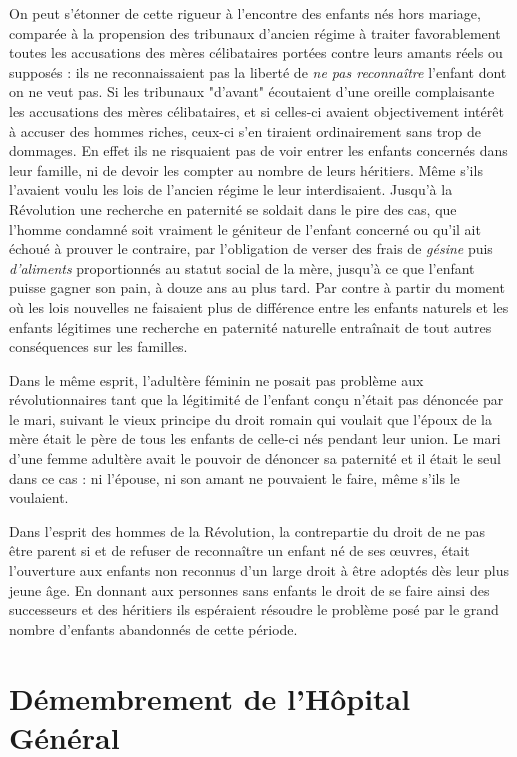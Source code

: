  On peut s'étonner de cette rigueur à l'encontre des enfants nés hors mariage, comparée à la propension des tribunaux d'ancien régime à traiter favorablement toutes les accusations des mères célibataires portées contre leurs amants réels ou supposés : ils ne reconnaissaient pas la liberté de \emph{ne pas reconnaître} l'enfant dont on ne veut pas. Si les tribunaux "d'avant" écoutaient d'une oreille complaisante les accusations des mères célibataires, et si celles-ci avaient objectivement intérêt à accuser des hommes riches, ceux-ci s'en tiraient ordinairement sans trop de dommages. En effet ils ne risquaient pas de voir entrer les enfants concernés dans leur famille, ni de devoir les compter au nombre de leurs héritiers. Même s'ils l'avaient voulu les lois de l'ancien régime le leur interdisaient. Jusqu'à la Révolution une recherche en paternité se soldait dans le pire des cas, que l’homme condamné soit vraiment le géniteur de l’enfant concerné ou qu'il ait échoué à prouver le contraire, par l’obligation de verser des frais de \emph{gésine} puis \emph{d'aliments} proportionnés au statut social de la mère, jusqu'à ce que l'enfant puisse gagner son pain, à douze ans au plus tard. Par contre à partir du moment où les lois nouvelles ne faisaient plus de différence entre les enfants naturels et les enfants légitimes une recherche en paternité naturelle entraînait de tout autres conséquences sur les familles. 

 Dans le même esprit, l'adultère féminin ne posait pas problème aux révolutionnaires tant que la légitimité de l'enfant conçu n'était pas dénoncée par le mari, suivant le vieux principe du droit romain qui voulait que l'époux de la mère était le père de tous les enfants de celle-ci nés pendant leur union. Le mari d'une femme adultère avait le pouvoir de dénoncer sa paternité et il était le seul dans ce cas : ni l'épouse, ni son amant ne pouvaient le faire, même s'ils le voulaient. 

 Dans l'esprit des hommes de la Révolution, la contrepartie du droit de ne pas être parent si et de refuser de reconnaître un enfant né de ses œuvres, était l'ouverture aux enfants non reconnus d'un large droit à être adoptés dès leur plus jeune âge. En donnant aux personnes sans enfants le droit de se faire ainsi des successeurs et des héritiers ils espéraient résoudre le problème posé par le grand nombre d'enfants abandonnés de cette période. 

 


\section{Démembrement de l'Hôpital Général}

